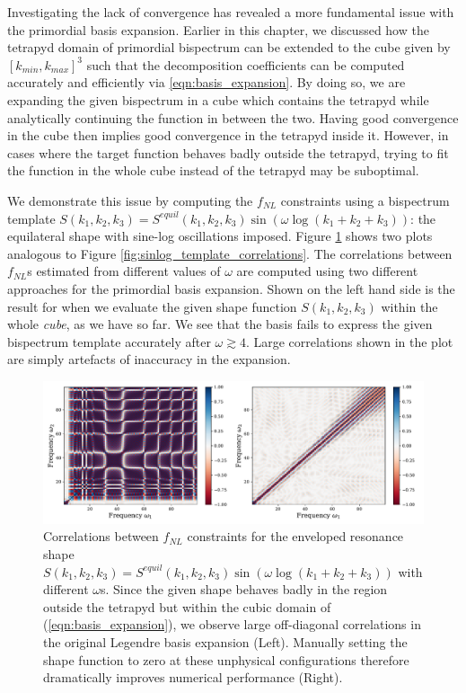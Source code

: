 Investigating the lack of convergence has revealed a more fundamental issue with the primordial basis expansion. Earlier in this chapter, we discussed how the tetrapyd domain of primordial bispectrum can be extended to the cube given by $[k_{min},k_{max}]^3$ such that the decomposition coefficients can be computed accurately and efficiently via \eqref{eqn:basis_expansion}. By doing so, we are expanding the given bispectrum in a cube which contains the tetrapyd while analytically continuing the function in between the two. Having good convergence in the cube then implies good convergence in the tetrapyd inside it. However, in cases where the target function behaves badly outside the tetrapyd, trying to fit the function in the whole cube instead of the tetrapyd may be suboptimal.

We demonstrate this issue by computing the $f_{NL}$ constraints using a bispectrum template $S(k_1,k_2,k_3) = S^{equil}(k_1,k_2,k_3) \sin(\omega \log(k_1+k_2+k_3))$: the equilateral shape with sine-log oscillations imposed. Figure \ref{fig:sinlog_equil_template_decomp_comparison} shows two plots analogous to Figure \ref{fig:sinlog_template_correlations}. The correlations between $f_{NL}$s estimated from different values of $\omega$ are computed using two different approaches for the primordial basis expansion. Shown on the left hand side is the result for when we evaluate the given shape function $S(k_1,k_2,k_3)$ within the whole \textit{cube}, as we have so far. We see that the basis fails to express the given bispectrum template accurately after $\omega\gtrsim4$. Large correlations shown in the plot are simply artefacts of inaccuracy in the expansion.

\begin{figure}[htbp!] 
	\centering    
	\includegraphics[width=\textwidth]{sinlog_equil_template_correlations_compare_decomp.pdf}
	\caption{Correlations between $f_{NL}$ constraints for the enveloped resonance shape $S(k_1,k_2,k_3) = S^{equil}(k_1,k_2,k_3) \sin(\omega \log(k_1+k_2+k_3))$ with different $\omega$s. Since the given shape behaves badly in the region outside the tetrapyd but within the cubic domain of (\ref{eqn:basis_expansion}), we observe large off-diagonal correlations in the original Legendre basis expansion (Left). Manually setting the shape function to zero at these unphysical configurations therefore dramatically improves numerical performance (Right). }
	\label{fig:sinlog_equil_template_decomp_comparison}
\end{figure}

